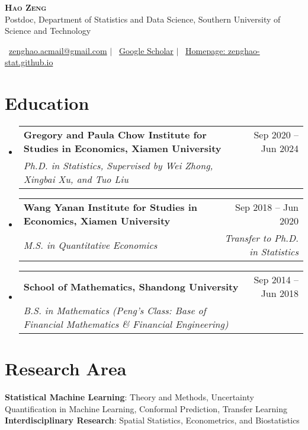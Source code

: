 \documentclass[letterpaper,10pt]{article}
\makeatletter
\newcommand{\resumeSubheading}[4]{
  \vspace{-2pt}\item
    \begin{tabular*}{0.97\textwidth}[t]{l@{\extracolsep{\fill}}r}
      \textbf{#1} & #2 \\
      \textit{\small#3} & \textit{\small #4} \\
    \end{tabular*}\vspace{-7pt}
}
\newcommand{\resumeSubHeadingListStart}{\begin{itemize}[leftmargin=0.15in, label={}]}
\newcommand{\resumeSubHeadingListEnd}{\end{itemize}}
\makeatother
\begin{document}
\begin{center}
    \textbf{\Huge \scshape Hao Zeng}
    \vspace{0.5em}\\
    {\small Postdoc, Department of Statistics and Data Science, Southern University of Science and Technology}
\end{center}

\begin{center}
    \small {}\ \href{mailto:zenghao.acmail@gmail.com}{zenghao.acmail@gmail.com} $|$
    \ \href{https://scholar.google.com/citations?user=-EiBHeIAAAAJ&hl=en}{Google Scholar} $|$
    \ \href{https://zenghao-stat.github.io}{Homepage: zenghao-stat.github.io}
\end{center}

\section{Education}
  \resumeSubHeadingListStart
    \resumeSubheading
      {Gregory and Paula Chow Institute for Studies in Economics, Xiamen University}{Sep 2020 -- Jun 2024}
      {Ph.D. in Statistics, Supervised by Wei Zhong, Xingbai Xu, and Tuo Liu}{}
    
    \resumeSubheading
      {Wang Yanan Institute for Studies in Economics, Xiamen University}{Sep 2018 -- Jun 2020}
      {M.S. in Quantitative Economics}{Transfer to Ph.D. in Statistics}
    
    \resumeSubheading
      {School of Mathematics, Shandong University}{Sep 2014 -- Jun 2018}
      {B.S. in Mathematics (Peng's Class: Base of Financial Mathematics \& Financial Engineering)}{}
  \resumeSubHeadingListEnd


\section{Research Area}
\begin{itemize}[leftmargin=0.15in, label={}]
    \small{\item{
     \textbf{Statistical Machine Learning}{: Theory and Methods, Uncertainty Quantification in Machine Learning, Conformal Prediction, Transfer Learning} \\
     \textbf{Interdisciplinary Research}{: Spatial Statistics, Econometrics, and Biostatistics}
    }}
\end{itemize}
\end{document}
